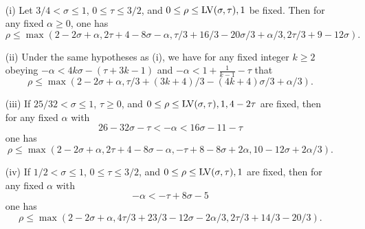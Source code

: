     \begin{lemma}\label{kerr-thm}\
        \begin{itemize}
        \item[(i)]\cite[Theorem 2]{kerr} Let $3/4 < \sigma \leq 1$, $0 \leq \tau \leq 3/2$, and $0 \leq \rho \leq \mathrm{LV}(\sigma,\tau), 1$ be fixed.  Then for any fixed $\alpha \geq 0$, one has
        $$ \rho \leq \max( 2-2\sigma+\alpha, 2\tau+4-8\sigma-\alpha, \tau/3+16/3 -20\sigma/3 + \alpha/3, 2\tau/3+9-12\sigma).$$
        \item[(ii)] \cite[Theorem 3]{kerr} Under the same hypotheses as (i), we have for any fixed integer $k \geq 2$ obeying
        $-\alpha < 4k\sigma -(\tau+3k-1)$ and $-\alpha < 1 + \frac{1}{k-1} - \tau$ that
        $$ \rho \leq \max(2-2\sigma+\alpha, \tau/3+(3k+4)/3-(4k+4)\sigma/3 + \alpha/3).$$
        \item[(iii)] \cite[Theorem 4]{kerr} If $25/32 < \sigma \leq 1$, $\tau \geq 0$, and $0 \leq \rho \leq \mathrm{LV}(\sigma,\tau), 1, 4-2\tau$ are fixed, then for any fixed $\alpha$ with
        $$ 26 - 32 \sigma - \tau < - \alpha < 16\sigma -11-\tau$$
        one has
        $$ \rho \leq \max( 2-2\sigma+\alpha, 2\tau+4-8\sigma-\alpha, -\tau+8-8\sigma+2\alpha, 10-12\sigma+2\alpha/3).$$
        \item[(iv)] \cite[Theorem 5]{kerr} If $1/2 < \sigma \leq 1$, $0 \leq \tau \leq 3/2$, and $0 \leq \rho \leq \mathrm{LV}(\sigma,\tau), 1$ are fixed, then for any fixed $\alpha$ with
        $$ - \alpha < -\tau + 8\sigma - 5$$
        one has
        $$ \rho \leq \max(2-2\sigma+\alpha, 4\tau/3 +23/3 - 12\sigma - 2\alpha/3, 2\tau/3 + 14/3 - 20/3 ).$$
    \end{itemize}
    \end{lemma}